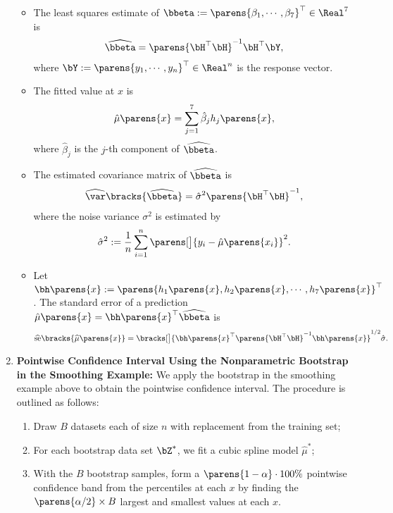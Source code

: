 \documentclass[12pt]{article}
\begin{document}
\begin{enumerate}[label=\textbf{\arabic*.}]
	\begin{itemize}
		\item The least squares estimate of $\bbeta := \parens{\beta_1, \cdots, \beta_7}^\top \in \Real^7$ is
		\begin{align}
			\widehat{\bbeta} = \parens{\bH^\top \bH}^{-1} \bH^\top \bY, 
		\end{align}
		where $\bY := \parens{y_1, \cdots, y_n}^\top \in \Real^n$ is the response vector. 
		
		\item The fitted value at $x$ is 
		\begin{align}
			\hat{\mu} \parens{x} = \sum_{j=1}^7 \hat{\beta}_j h_j \parens{x}, 
		\end{align}
		where $\hat{\beta}_j$ is the $j$-th component of $\widehat{\bbeta}$. 
		
		\item The estimated covariance matrix of $\widehat{\bbeta}$ is
		\begin{align}
			\widehat{\var} \bracks{\widehat{\bbeta}} = \hat{\sigma}^2 \parens{\bH^\top \bH}^{-1}, 
		\end{align}
		where the noise variance $\sigma^2$ is estimated by 
		\begin{align}
			\hat{\sigma}^2 := \frac{1}{n} \sum_{i=1}^n \parens[\big]{y_i - \hat{\mu} \parens{x_i}}^2. 
		\end{align}
		
		\item Let $\bh \parens{x} := \parens{h_1 \parens{x}, h_2 \parens{x}, \cdots, h_7 \parens{x}}^\top$. The standard error of a prediction $\hat{\mu} \parens{x} = \bh \parens{x}^\top \widehat{\bbeta}$ is
		\begin{equation}\label{eq-se-ls}
			\widehat{\mathrm{se}} \bracks{\widehat{\mu} \parens{x}} = \bracks[\big]{ \bh \parens{x}^\top \parens{\bH^\top \bH}^{-1} \bh \parens{x} }^{1/2} \hat{\sigma}.
		\end{equation}
		
	\end{itemize}
	
	\item \textbf{Pointwise Confidence Interval Using the Nonparametric Bootstrap in the Smoothing Example:} We apply the bootstrap in the smoothing example above to obtain the pointwise confidence interval. The procedure is outlined as follows: 
	\begin{enumerate}[label=(\arabic*)]
		\item Draw $B$ datasets each of size $n$ with replacement from the training set; 
		\item For each bootstrap data set $\bZ^*$, we fit a cubic spline model $\hat{\mu}^*$; 
		\item With the $B$ bootstrap samples, form a $\parens{1 - \alpha} \cdot 100\%$ pointwise confidence band from the percentiles at each $x$ by finding the $\parens{\alpha / 2} \times B$ largest and smallest values at each $x$. 
	\end{enumerate}
	

\end{enumerate}
\end{document}
